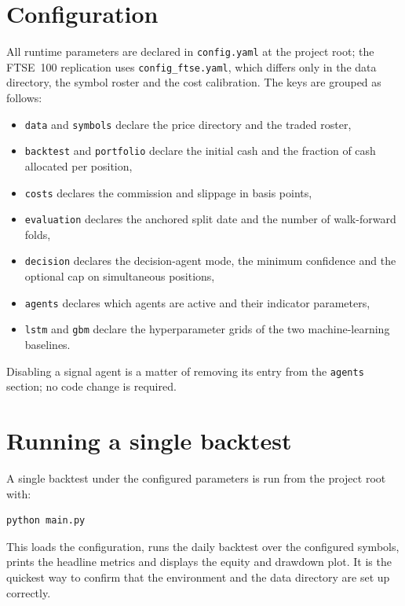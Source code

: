 \section{Configuration}\label{app:configuration}

All runtime parameters are declared in \texttt{config.yaml} at the project root; the FTSE~100 replication uses \texttt{config\_ftse.yaml}, which differs only in the data directory, the symbol roster and the cost calibration. The keys are grouped as follows:

\begin{itemize}
    \item \texttt{data} and \texttt{symbols} declare the price directory and the traded roster,
    \item \texttt{backtest} and \texttt{portfolio} declare the initial cash and the fraction of cash allocated per position,
    \item \texttt{costs} declares the commission and slippage in basis points,
    \item \texttt{evaluation} declares the anchored split date and the number of walk-forward folds,
    \item \texttt{decision} declares the decision-agent mode, the minimum confidence and the optional cap on simultaneous positions,
    \item \texttt{agents} declares which agents are active and their indicator parameters,
    \item \texttt{lstm} and \texttt{gbm} declare the hyperparameter grids of the two machine-learning baselines.
\end{itemize}

\noindent
Disabling a signal agent is a matter of removing its entry from the \texttt{agents} section; no code change is required.

\section{Running a single backtest}\label{app:single_run}

A single backtest under the configured parameters is run from the project root with:

\begin{verbatim}
python main.py
\end{verbatim}

\noindent
This loads the configuration, runs the daily backtest over the configured symbols, prints the headline metrics and displays the equity and drawdown plot. It is the quickest way to confirm that the environment and the data directory are set up correctly.


